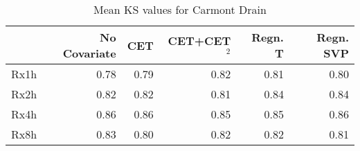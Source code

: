 \begin{table}
\caption{Mean KS values for Carmont Drain}
\label{tab:ks}
\begin{tabular}{lrrrrr}
\toprule
 & No Covariate & CET & CET+CET$^2$ & Regn. T & Regn. SVP \\
\midrule
Rx1h & 0.78 & 0.79 & 0.82 & 0.81 & 0.80 \\
Rx2h & 0.82 & 0.82 & 0.81 & 0.84 & 0.84 \\
Rx4h & 0.86 & 0.86 & 0.85 & 0.85 & 0.86 \\
Rx8h & 0.83 & 0.80 & 0.82 & 0.82 & 0.81 \\
\bottomrule
\end{tabular}
\end{table}
